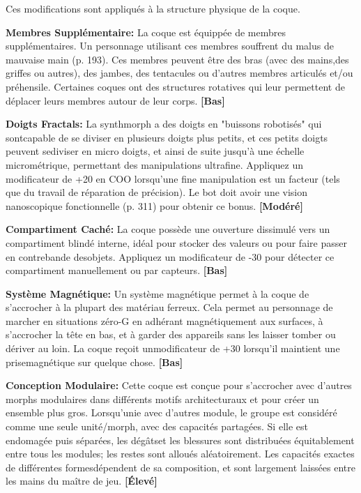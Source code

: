 {{Ces modifications sont appliqués à la structure physique de la coque. 

\textbf{Membres Supplémentaire:} La coque est équippée de membres supplémentaires. Un personnage utilisant ces membres souffrent du malus de mauvaise main (p. 193). Ces membres peuvent être des bras (avec des mains,des griffes ou autres), des jambes, des tentacules ou d'autres membres articulés et/ou préhensile. Certaines coques ont des structures rotatives qui leur permettent de déplacer leurs membres autour de leur corps. \textbf{[Bas]} 

\textbf{Doigts Fractals:} La synthmorph a des doigts en "buissons robotisés" qui sontcapable de se diviser en plusieurs doigts plus petits, et ces petits doigts peuvent sediviser en micro doigts, et ainsi de suite jusqu'à une échelle micrométrique, permettant des manipulations ultrafine. Appliquez un modificateur de +20 en COO lorsqu'une fine manipulation est un facteur (tels que du travail de réparation de précision). Le bot doit avoir une vision nanoscopique fonctionnelle (p. 311) pour obtenir ce bonus. \textbf{[Modéré]} 

\textbf{Compartiment Caché:} La coque possède une ouverture dissimulé vers un compartiment blindé interne, idéal pour stocker des valeurs ou pour faire passer en contrebande desobjets. Appliquez un modificateur de -30 pour détecter ce compartiment manuellement ou par capteurs. \textbf{[Bas]} 

\textbf{Système Magnétique:} Un système magnétique permet à la coque de s'accrocher à la plupart des matériau ferreux. Cela permet au personnage de marcher en situations zéro-G en adhérant magnétiquement aux surfaces, à s'accrocher la tête en bas, et à garder des appareils sans les laisser tomber ou dériver au loin. La coque reçoit unmodificateur de +30 lorsqu'il maintient une prisemagnétique sur quelque chose. \textbf{[Bas]} 

\textbf{Conception Modulaire:} Cette coque est conçue pour s'accrocher avec d'autres morphs modulaires dans différents motifs architecturaux et pour créer un ensemble plus gros. Lorsqu'unie avec d'autres module, le groupe est considéré comme une seule unité/morph, avec des capacités partagées. Si elle est endomagée puis séparées, les dégâtset les blessures sont distribuées équitablement entre tous les modules; les restes sont alloués aléatoirement. Les capacités exactes de différentes formesdépendent de sa composition, et sont largement laissées entre les mains du maître de jeu. \textbf{[Élevé]} 

}}
